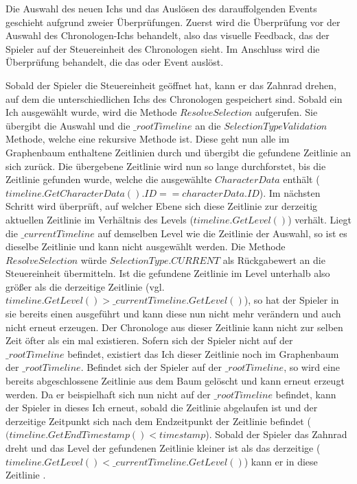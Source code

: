 Die Auswahl des neuen Ichs und das Auslösen des darauffolgenden Events geschieht aufgrund zweier Überprüfungen. Zuerst wird die Überprüfung vor der Auswahl des Chronologen-Ichs behandelt, also das visuelle Feedback, das der Spieler auf der Steuereinheit des Chronologen sieht. Im Anschluss wird die Überprüfung behandelt, die das  oder  Event auslöst.

Sobald der Spieler die Steuereinheit geöffnet hat, kann er das Zahnrad drehen, auf dem die unterschiedlichen Ichs des Chronologen gespeichert sind. Sobald ein Ich ausgewählt wurde, wird die  Methode $ResolveSelection$ aufgerufen. Sie übergibt die Auswahl und die $\_rootTimeline$ an die $SelectionTypeValidation$ Methode, welche eine rekursive Methode ist. Diese geht nun alle im Graphenbaum enthaltene Zeitlinien durch und übergibt die gefundene Zeitlinie an sich zurück. 
Die übergebene Zeitlinie wird nun so lange durchforstet, bis die Zeitlinie gefunden wurde, welche die ausgewählte $CharacterData$ enthält ($timeline.GetCharacterData().ID == characterData.ID$). Im nächsten Schritt wird überprüft, auf welcher Ebene sich diese Zeitlinie zur derzeitig aktuellen Zeitlinie im Verhältnis des Levels ($timeline.GetLevel()$) verhält. Liegt die $\_currentTimeline$ auf demselben Level wie die Zeitlinie der Auswahl, so ist es dieselbe Zeitlinie und kann nicht ausgewählt werden. Die Methode $ResolveSelection$ würde $SelectionType.CURRENT$ als Rückgabewert an die Steuereinheit übermitteln. Ist die gefundene Zeitlinie im Level unterhalb also größer als die derzeitige Zeitlinie (vgl. $timeline.GetLevel() > \_currentTimeline.GetLevel()$), so hat der Spieler in sie bereits einen  ausgeführt und kann diese nun nicht mehr verändern und auch nicht erneut erzeugen. Der Chronologe aus dieser Zeitlinie kann nicht zur selben Zeit öfter als ein mal existieren. Sofern sich der Spieler nicht auf der $\_rootTimeline$ befindet, existiert das Ich dieser Zeitlinie noch im Graphenbaum der $\_rootTimeline$. Befindet sich der Spieler auf der $\_rootTimeline$, so wird eine bereits abgeschlossene Zeitlinie aus dem Baum gelöscht und kann erneut erzeugt werden. Da er beispielhaft sich nun nicht auf der $\_rootTimeline$ befindet, kann der Spieler in dieses Ich erneut,  sobald die Zeitlinie abgelaufen ist und der derzeitige Zeitpunkt sich nach dem Endzeitpunkt der Zeitlinie befindet ($(timeline.GetEndTimestamp() < timestamp$).
Sobald der Spieler das Zahnrad dreht und das Level der gefundenen Zeitlinie kleiner ist als das derzeitige ($timeline.GetLevel() < \_currentTimeline.GetLevel()$) kann er in diese Zeitlinie .

